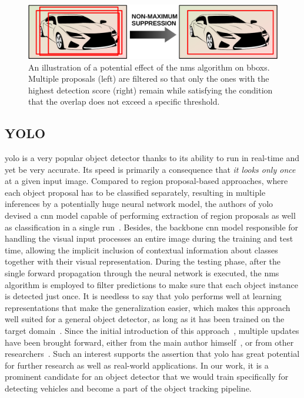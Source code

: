 \begin{figure}[t]
    \centerline{\includegraphics[width=0.7\linewidth]{figures/theoretical_foundations/non_maximum_suppression.pdf}}
    \caption[\Gls{nms} visualization]{An illustration of a potential effect of the \gls{nms} algorithm on \glspl{bbox}. Multiple proposals (left) are filtered so that only the ones with the highest detection score (right) remain while satisfying the condition that the overlap does not exceed a specific threshold.}
    \label{fig:NonMaximumSuppression}
\end{figure}

\subsection{YOLO}
\label{ssec:YouLookOnlyOnce}

\Gls{yolo} is a very popular object detector thanks to its ability to run in real-time and yet be very accurate. Its speed is primarily a consequence that \emph{it looks only once} at a given input image. Compared to region proposal-based approaches, where each object proposal has to be classified separately, resulting in multiple inferences by a potentially huge neural network model, the authors of \gls{yolo} devised a \gls{cnn} model capable of performing extraction of region proposals as well as classification in a single run~\cite{redmon2016yolo}. Besides, the backbone \gls{cnn} model responsible for handling the visual input processes an entire image during the training and test time, allowing the implicit inclusion of contextual information about classes together with their visual representation. During the testing phase, after the single forward propagation through the neural network is executed, the \gls{nms} algorithm is employed to filter predictions to make sure that each object instance is detected just once. It is needless to say that \Gls{yolo} performs well at learning representations that make the generalization easier, which makes this approach well suited for a general object detector, as long as it has been trained on the target domain~\cite{redmon2016yolo}. Since the initial introduction of this approach~\cite{redmon2016yolo}, multiple updates have been brought forward, either from the main author himself~\cite{redmon2017yolo9000, redmon2018yolov3}, or from other researchers~\cite{wang2020yolov4, wong2019yolonano}. Such an interest supports the assertion that \gls{yolo} has great potential for further research as well as real-world applications. In our work, it is a prominent candidate for an object detector that we would train specifically for detecting vehicles and become a part of the object tracking pipeline.

